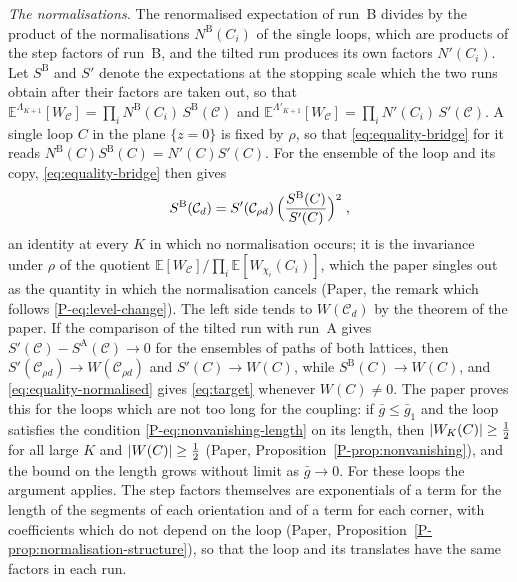 \documentclass[11pt]{preprint}
\DeclarePairedDelimiter{\abs}{\lvert}{\rvert}
\numberwithin{equation}{section}
\theoremstyle{definition}
\theoremstyle{remark}
\theoremstyle{plain}
\begin{document}
\emph{The normalisations.} The renormalised expectation of run~B divides by the product of the normalisations $N^{\mathrm B}(C_i)$ of the single loops, which are products of the step factors of run~B, and the tilted run produces its own factors $N'(C_i)$. Let $S^{\mathrm B}$ and $S'$ denote the expectations at the stopping scale which the two runs obtain after their factors are taken out, so that $\mathbb E^{\Lambda_{K+1}}[W_{\mathcal C}] = \prod_iN^{\mathrm B}(C_i)\,S^{\mathrm B}(\mathcal C)$ and $\mathbb E^{\Lambda'_{K+1}}[W_{\mathcal C}] = \prod_iN'(C_i)\,S'(\mathcal C)$. A single loop $C$ in the plane $\{ z = 0 \}$ is fixed by $\rho$, so that \eqref{eq:equality-bridge} for it reads $N^{\mathrm B}(C)S^{\mathrm B}(C) = N'(C)S'(C)$. For the ensemble of the loop and its copy, \eqref{eq:equality-bridge} then gives
\begin{equation}\label{eq:equality-normalised}
    S^{\mathrm B}(\mathcal C_d) = S'(\mathcal C_{\rho d})\,\Bigl(\frac{S^{\mathrm B}(C)}{S'(C)}\Bigr)^2\;,
\end{equation}
an identity at every $K$ in which no normalisation occurs; it is the invariance under $\rho$ of the quotient $\mathbb E[W_{\mathcal C}]/\prod_i\mathbb E[W_{\chi_i}(C_i)]$, which the paper singles out as the quantity in which the normalisation cancels (Paper, the remark which follows \eqref{P-eq:level-change}). The left side tends to $W(\mathcal C_d)$ by the theorem of the paper. If the comparison of the tilted run with run~A gives $S'(\mathcal C) - S^{\mathrm A}(\mathcal C) \to 0$ for the ensembles of paths of both lattices, then $S'(\mathcal C_{\rho d}) \to W(\mathcal C_{\rho d})$ and $S'(C) \to W(C)$, while $S^{\mathrm B}(C) \to W(C)$, and \eqref{eq:equality-normalised} gives \eqref{eq:target} whenever $W(C) \neq 0$. The paper proves this for the loops which are not too long for the coupling: if $\bar g \leq \bar g_1$ and the loop satisfies the condition \eqref{P-eq:nonvanishing-length} on its length, then $\abs{W_K(C)} \geq \frac12$ for all large $K$ and $\abs{W(C)} \geq \frac12$ (Paper, Proposition~\ref{P-prop:nonvanishing}), and the bound on the length grows without limit as $\bar g \to 0$. For these loops the argument applies. The step factors themselves are exponentials of a term for the length of the segments of each orientation and of a term for each corner, with coefficients which do not depend on the loop (Paper, Proposition~\ref{P-prop:normalisation-structure}), so that the loop and its translates have the same factors in each run.
\end{document}
